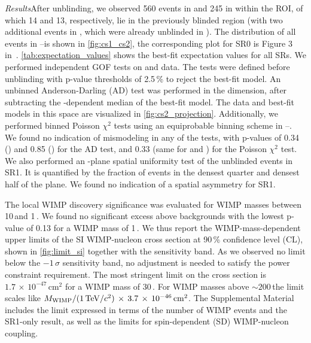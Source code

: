 \documentclass[
    reprint,
    superscriptaddress,
    aps, prl,
    amsmath,amssymb,
    twocolumn,
    showkeys,
    floatfix,
    nofootinbib,
]{revtex4-2}
\begin{document}
\textit{Results\textemdash}After unblinding, we observed 560 events in \sronea and 245 in \sroneb within the ROI, of which 14 and 13, respectively, lie in the previously blinded region (with two additional events in \sroneb, which were already unblinded in \cite{XENON:2024cevns}).
The distribution of all events in \csone--\cstwo is shown in \cref{fig:cs1_cs2}, the corresponding plot for SR0 is Figure 3 in~\cite{XENON:2023wimp}.
\cref{tab:expectation_values} shows the best-fit expectation values for all SRs.
We performed independent GOF tests on \sronea and \sroneb data.
The tests were defined before unblinding with p-value thresholds of 2.5\,\% to reject the best-fit model.
An unbinned Anderson-Darling (AD) test \cite{anderson1952asymptotic} was performed in the \cstwo dimension, after subtracting the \csone-dependent median of the best-fit model.
The data and best-fit models in this space are visualized in \cref{fig:cs2_projection}.
Additionally, we performed binned Poisson $\chi^2$ tests using an equiprobable binning scheme in \csone--\cstwo.
We found no indication of mismodeling in any of the tests, with p-values of 0.34 (\sronea) and 0.85 (\sroneb) for the AD test, and 0.33 (same for \sronea and \sroneb) for the Poisson $\chi^2$ test.
We also performed an \xy-plane spatial uniformity test of the unblinded events in SR1.
It is quantified by the fraction of events in the densest quarter and densest half of the \xy plane.
We found no indication of a spatial asymmetry for SR1.

The local WIMP discovery significance was evaluated for WIMP masses between 10\,\gevcc and 1\,\tevcc.
We found no significant excess above backgrounds with the lowest p-value of 0.13 for a WIMP mass of 1\,\tevcc.
We thus report the WIMP-mass-dependent upper limits of the SI WIMP-nucleon cross section at 90\,\% confidence level (CL), shown in \cref{fig:limit_si} together with the sensitivity band.
As we observed no limit below the $-1\,\sigma$ sensitivity band, no adjustment is needed to satisfy the power constraint requirement.
The most stringent limit on the cross section is $1.7\,\times\,10^{-47}\,\mathrm{cm^2}$ for a WIMP mass of 30\,\gevcc.
For WIMP masses above $\sim200$\,\gevcc the limit scales like $M_{\mathrm{WIMP}}/(1\,\mathrm{TeV}/c^2) \,\times\, 3.7\,\times\,10^{-46}\,\mathrm{cm^2}$.
The Supplemental Material includes the limit expressed in terms of the number of WIMP events and the SR1-only result, as well as the limits for spin-dependent (SD) WIMP-nucleon coupling.
\end{document}
